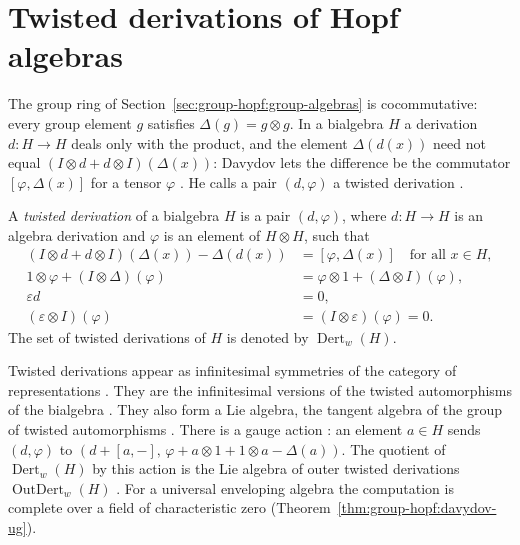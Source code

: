 \section{Twisted derivations of Hopf algebras}\label{sec:group-hopf:hopf}

The group ring of Section~\ref{sec:group-hopf:group-algebras} is cocommutative:
every group element $g$ satisfies $\Delta(g)=g\otimes g$. In a bialgebra $H$ a
derivation $d\colon H\to H$ deals only with the product, and the element
$\Delta(d(x))$ need not equal $(I\otimes d+d\otimes I)(\Delta(x))$: Davydov lets the
difference be the commutator $[\varphi,\Delta(x)]$ for a tensor $\varphi$
\cite[p.~572]{Davydov2013}. He calls a pair $(d,\varphi)$ a twisted derivation
\cite[p.~572]{Davydov2013}.

\begin{definition}\label{def:group-hopf:twisted}
A \emph{twisted derivation} of a bialgebra $H$ is a pair $(d,\varphi)$, where
$d\colon H\to H$ is an algebra derivation and $\varphi$ is an element of
$H\otimes H$, such that
\begin{align*}
(I\otimes d+d\otimes I)(\Delta(x))-\Delta(d(x))&=[\varphi,\Delta(x)] \quad
\text{for all } x\in H,\\
1\otimes\varphi+(I\otimes\Delta)(\varphi)&=\varphi\otimes1+(\Delta\otimes I)(\varphi),\\
\varepsilon d&=0,\\
(\varepsilon\otimes I)(\varphi)&=(I\otimes\varepsilon)(\varphi)=0.
\end{align*}
The set of twisted derivations of $H$ is denoted by $\operatorname{Dert}_w(H)$.
\end{definition}

Twisted derivations appear as infinitesimal symmetries of the category of
representations \cite[p.~567]{Davydov2013}. They are the infinitesimal versions
of the twisted automorphisms of the bialgebra \cite[p.~567]{Davydov2013}. They
also form a Lie algebra, the tangent algebra of the group of twisted
automorphisms \cite[p.~567]{Davydov2013}. There is a gauge action
\cite[pp.~567--568]{Davydov2013}: an element $a\in H$ sends $(d,\varphi)$ to
$(d+[a,-],\,\varphi+a\otimes1+1\otimes a-\Delta(a))$. The quotient of
$\operatorname{Dert}_w(H)$ by this action is the Lie algebra of outer twisted
derivations $\operatorname{OutDert}_w(H)$ \cite[pp.~567--568]{Davydov2013}.
For a universal enveloping algebra the computation is complete over a field of
characteristic zero (Theorem~\ref{thm:group-hopf:davydov-ug}).

